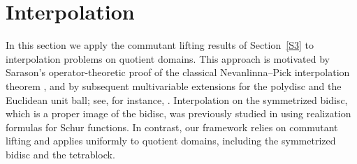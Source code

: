 \documentclass[12pt,reqno]{amsart}
\theoremstyle{remark}
\theoremstyle{definition}
\def \z{\boldsymbol{z}}
\begin{document}





\section{Interpolation} \label{S4}
In this section we apply the commutant lifting results of Section~\ref{S3} to interpolation problems on quotient domains. 
This approach is motivated by Sarason’s operator-theoretic proof of the classical Nevanlinna–Pick interpolation theorem \cite[Section~4]{DS1967}, and by subsequent multivariable extensions for the polydisc and the Euclidean unit ball; see, for instance, \cite{DeS2026,BDS2025}.
Interpolation on the symmetrized bidisc, which is a proper image of the bidisc, was previously studied in \cite{AY2017,BS2018} using realization formulas for Schur functions. In contrast, our framework relies on commutant lifting and applies uniformly to quotient domains, including the symmetrized bidisc and the tetrablock.
\end{document}
